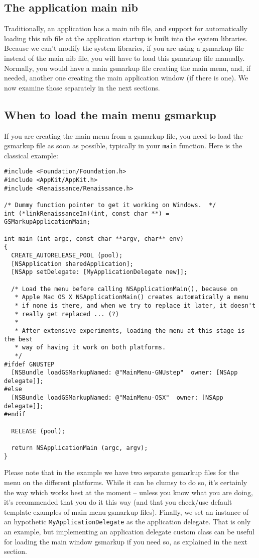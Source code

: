 \subsection{The application main nib}
Traditionally, an application has a main nib file, and support for
automatically loading this nib file at the application startup is
built into the system libraries.  Because we can't modify the system
libraries, if you are using a gsmarkup file instead of the main nib
file, you will have to load this gsmarkup file manually.  Normally,
you would have a main gsmarkup file creating the main menu, and, if
needed, another one creating the main application window (if there is
one).  We now examine those separately in the next sections.

\subsection{When to load the main menu gsmarkup}\label{integrating-renaissance-menu}
If you are creating the main menu from a gsmarkup file, you need to
load the gsmarkup file as soon as possible, typically in your
\texttt{main} function.  Here is the classical example:
\begin{verbatim}
#include <Foundation/Foundation.h>
#include <AppKit/AppKit.h>
#include <Renaissance/Renaissance.h>

/* Dummy function pointer to get it working on Windows.  */
int (*linkRenaissanceIn)(int, const char **) = GSMarkupApplicationMain;

int main (int argc, const char **argv, char** env)
{
  CREATE_AUTORELEASE_POOL (pool);
  [NSApplication sharedApplication];
  [NSApp setDelegate: [MyApplicationDelegate new]];

  /* Load the menu before calling NSApplicationMain(), because on
   * Apple Mac OS X NSApplicationMain() creates automatically a menu
   * if none is there, and when we try to replace it later, it doesn't
   * really get replaced ... (?)
   *
   * After extensive experiments, loading the menu at this stage is the best
   * way of having it work on both platforms.
   */
#ifdef GNUSTEP
  [NSBundle loadGSMarkupNamed: @"MainMenu-GNUstep"  owner: [NSApp delegate]];
#else
  [NSBundle loadGSMarkupNamed: @"MainMenu-OSX"  owner: [NSApp delegate]];
#endif

  RELEASE (pool);

  return NSApplicationMain (argc, argv);
}
\end{verbatim}
Please note that in the example we have two separate gsmarkup files
for the menu on the different platforms.  While it can be clumsy to do
so, it's certainly the way which works best at the moment -- unless
you know what you are doing, it's recommended that you do it this way
(and that you check/use default template examples of main menu
gsmarkup files).  Finally, we set an instance of an hypothetic
\texttt{MyApplicationDelegate} as the application delegate.  
That is only an example, but implementing an application delegate
custom class can be useful for loading the main window gsmarkup if you
need so, as explained in the next section.

